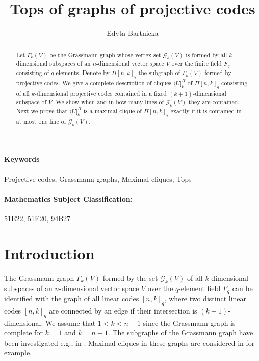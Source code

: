 \documentclass[12pt]{article}
\date{}
\theoremstyle{definition}
\begin{document}
\author{Edyta Bartnicka}
  \title{Tops of graphs of projective codes}
  \maketitle

  \begin{abstract}
Let $\Gamma_k(V)$ be the Grassmann graph whose vertex set  ${\mathcal G}_{k}(V)$  is formed by all $k$-dimensional subspaces of an $n$-dimensional vector space $V$ over the finite field $F_q$ consisting of $q$ elements. Denote by  $\Pi[n,k]_q$ the subgraph of $\Gamma_k(V)$ formed by projective  codes.  We give a complete description of cliques $\langle U]^{\Pi}_{k}$ of  $\Pi[n,k]_q$ consisting of all $k$-dimensional projective codes contained in a fixed  $(k+1)$-dimensional subspace of $V$. We show when and in how many lines of  ${\mathcal G}_{k}(V)$ they are contained. Next we prove that $\langle U]^{\Pi}_{k}$ is a maximal clique of $\Pi[n,k]_q$ exactly if it
  is contained in at most one line of  ${\mathcal G}_{k}(V)$.
\end{abstract}

\paragraph{\rm\bf Keywords}
Projective codes, Grassmann graphs, Maximal cliques, Tops

\paragraph{\rm\bf Mathematics Subject Classification:}
51E22, 51E20, 94B27

\section{Introduction}

The Grassmann graph  $\Gamma_k(V)$ formed by the set ${\mathcal G}_{k}(V)$ of all $k$-dimensional subspaces of an $n$-dimensional vector space $V$ over the $q$-element field $F_q$ can be identified with the graph of all linear  codes $[n, k]_q$, where two distinct linear codes $[n, k]_q$ are connected by an edge if %
their intersection is $(k-1)$-dimensional. We assume that  $1<k<n-1$ since the Grassmann graph is complete for $k=1$ and $k=n-1$. The subgraphs of the Grassmann graph  have been investigated e.g., in
\cite{CGK, KP2, Pankov2023}.
Maximal cliques in these graphs  are considered in \cite{%
KP4} for example.
\end{document}
